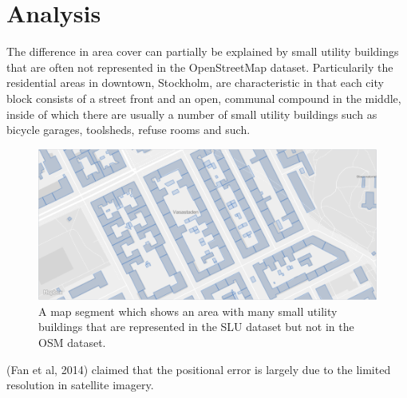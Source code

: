 \documentclass[a4paper]{article}
\begin{document}
\section{Analysis}

The difference in area cover can partially be explained by small utility buildings that are often not represented in the OpenStreetMap dataset. Particularily the residential areas in downtown, Stockholm, are characteristic in that each city block consists of a street front and an open, communal compound in the middle, inside of which there are usually a number of small utility buildings such as bicycle garages, toolsheds, refuse rooms and such.

\begin{figure}[H]
    \centering
    \includegraphics[width=\textwidth,height=0.5\textheight,keepaspectratio]{img_map_utility_buildings}
    \caption{A map segment which shows an area with many small utility buildings that are represented in the SLU dataset but not in the OSM dataset.}
    \label{fig:space}
\end{figure}

(Fan et al, 2014) claimed that the positional error is largely due to the limited resolution in satellite imagery.
\end{document}
